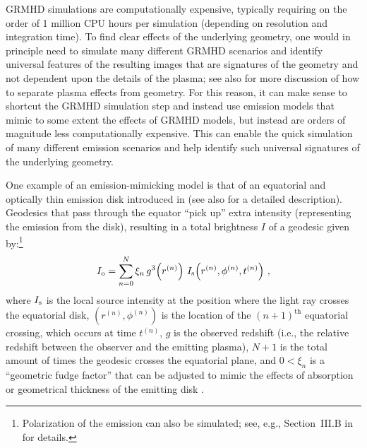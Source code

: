\documentclass[graybox,envcountchap]{svmult}
\newcommand{\pa}[1]{\left(#1\right)}
\begin{document}
\bigskip

GRMHD simulations are computationally expensive, typically requiring on the order of 1 million CPU hours per simulation (depending on resolution and integration time).
To find clear effects of the underlying geometry, one would in principle need to simulate many different GRMHD scenarios and identify universal features of the resulting images that are signatures of the geometry and not dependent upon the details of the plasma; see also \cite{Gralla2021,Lara2021,Ozel2022,Bauer2022} for more discussion of how to separate plasma effects from geometry.
For this reason, it can make sense to shortcut the GRMHD simulation step and instead use emission models that mimic to some extent the effects of GRMHD models, but instead are orders of magnitude less computationally expensive.
This can enable the quick simulation of many different emission scenarios and help identify such universal signatures of the underlying geometry.

One example of an emission-mimicking model is that of an equatorial and optically thin emission disk introduced in \cite{GLM2020} (see also \cite{CardenasAvendano2022} for a detailed description).
Geodesics that pass through the equator ``pick up'' extra intensity (representing the emission from the disk), resulting in a total brightness $I$ of a geodesic given by:\footnote{Polarization of the emission can also be simulated; see, e.g., Section~III.B in \cite{CardenasAvendano2022} for details.}
\begin{align}
    \label{eq:MockIntensity}
    I_{\rm o}=\sum_{n=0}^N\xi_n\,g^3\!\pa{r^{(n)}}\,I_{\rm s}\!\pa{r^{(n)},\phi^{(n)},t^{(n)}}\,,
\end{align}
where $I_{\rm s}$ is the local source intensity at the position where the light ray crosses the equatorial disk, $(r^{(n)},\phi^{(n)})$ is the location of the $(n+1)^\text{th}$ equatorial crossing, which occurs at time $t^{(n)}$, $g$ is the observed redshift (i.e., the relative redshift between the observer and the emitting plasma), $N+1$ is the total amount of times the geodesic crosses the equatorial plane, and $0<\xi_n$ is a ``geometric fudge factor'' that can be adjusted to mimic the effects of absorption or geometrical thickness of the emitting disk \cite{GLM2020,Chael2021,Paugnat2022,CardenasAvendano2022}.
\end{document}
